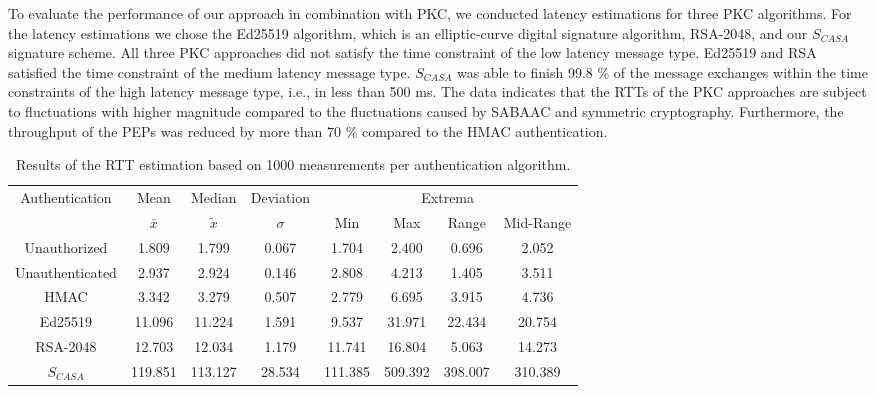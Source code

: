 To evaluate the performance of our approach in combination with PKC, we conducted latency estimations for three PKC algorithms.
For the latency estimations we chose the Ed25519 algorithm, which is an elliptic-curve digital signature algorithm, RSA-2048, and our $S_{CASA}$ signature scheme.
All three PKC approaches did not satisfy the time constraint of the low latency message type.
Ed25519 and RSA satisfied the time constraint of the medium latency message type.
$S_{CASA}$ was able to finish 99.8 \% of the message exchanges within the time constraints of the high latency message type, i.e., in less than 500 ms.
The data indicates that the RTTs of the PKC approaches are subject to fluctuations with higher magnitude compared to the fluctuations caused by SABAAC and symmetric cryptography.
Furthermore, the throughput of the PEPs was reduced by more than 70 \% compared to the HMAC authentication.
\begin{table}
    \centering
    \small
    \caption{Results of the RTT estimation based on 1000 measurements per authentication algorithm.}
    \label{tab:rtt_metrics}
    \begin{tabular}{c c c c c c c c}
    \toprule
    Authentication & Mean & Median & Deviation & \multicolumn{4}{c}{Extrema}\\
    \cmidrule(lr){5-8}
    & $\bar{x}$ & $\widetilde{x}$ & $\sigma$ & Min & Max & Range & Mid-Range\\
    \midrule
    Unauthorized    & 1.809 & 1.799 & 0.067 & 1.704 & 2.400 & 0.696 & 2.052 \\
    Unauthenticated & 2.937 & 2.924 & 0.146 & 2.808 & 4.213 & 1.405 & 3.511 \\
    HMAC            & 3.342 & 3.279 & 0.507 & 2.779 & 6.695 & 3.915 & 4.736 \\
    Ed25519        & 11.096 & 11.224& 1.591 & 9.537 & 31.971& 22.434 & 20.754 \\
    RSA-2048       & 12.703 & 12.034& 1.179 & 11.741& 16.804& 5.063 & 14.273 \\
    $S_{CASA}$    & 119.851 &113.127&28.534 &111.385&509.392&398.007&310.389\\
    \bottomrule
    \end{tabular}
\end{table}
